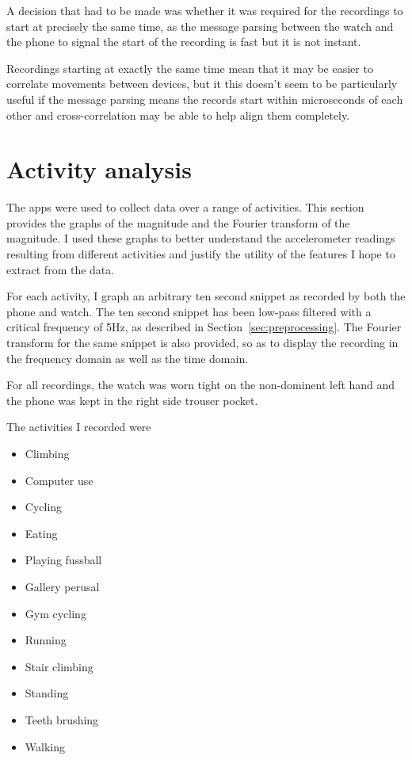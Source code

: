       A decision that had to be made was whether it was required for the recordings to start at precisely the same time, as the message parsing between the watch and the phone to signal the start of the recording is fast but it is not instant. 
      
      Recordings starting at exactly the same time mean that it may be easier to correlate movements between devices, but it this doesn't seem to be particularly useful if the message parsing means the records start within microseconds of each other and cross-correlation may be able to help align them completely.  
      
  \section{Activity analysis}
    \label{sec:activity-details}
    The apps were used to collect data over a range of activities. This section provides the graphs of the magnitude and the Fourier transform of the magnitude. I used these graphs to better understand the accelerometer readings resulting from different activities and justify the utility of the features I hope to extract from the data.
    
    For each activity, I graph an arbitrary ten second snippet as recorded by both the phone and watch. The ten second snippet has been low-pass filtered with a critical frequency of 5Hz, as described in Section~\ref{sec:preprocessing}. The Fourier transform for the same snippet is also provided, so as to display the recording in the frequency domain as well as the time domain.
    
    For all recordings, the watch was worn tight on the non-dominent left hand and the phone was kept in the right side trouser pocket.
    
    The activities I recorded were
    \begin{itemize}
      \item Climbing
      \item Computer use
      \item Cycling
      \item Eating
      \item Playing fussball
      \item Gallery perusal
      \item Gym cycling
      \item Running
      \item Stair climbing
      \item Standing
      \item Teeth brushing
      \item Walking
    \end{itemize}
    \pagebreak[4]
